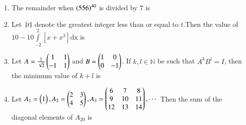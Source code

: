 \documentclass[journal]{IEEEtran}
\begin{document}
\begin{enumerate}[start=16]
\item The remainder when $\left(556\right)^{40}$ is divided by $7$ is \underline{\hspace{1cm}}\\

\item Let ${}\left[t\right]$ denote the greatest integer less than or equal to $t$.Then the value of $10-10\int\limits_{-2}^{2}{[x+x^3]}\text{dx}$ is \underline{\hspace{1cm}}\\

\item Let $A=\frac{1}{\sqrt{2}}\begin{pmatrix}1&1\\-1&1\end{pmatrix}$ and $B=\begin{pmatrix}1&0\\0&-1\end{pmatrix}$. If $k, l \in \mathbb N$ be such that $A^{k}B^{l}=I$, then the minimum value of $k+l$ is \underline{\hspace{1cm}}\\

\item Let $A_1=\begin{pmatrix}1\end{pmatrix}, A_2=\begin{pmatrix}2&3\\4&5\end{pmatrix},A_3=\begin{pmatrix}6&7&8\\9&10&11\\12&13&14\end{pmatrix},\cdots$ Then the sum of the diagonal elements of $A_{20}$ is \underline{\hspace{1cm}}\\

\end{enumerate}
\end{document}
